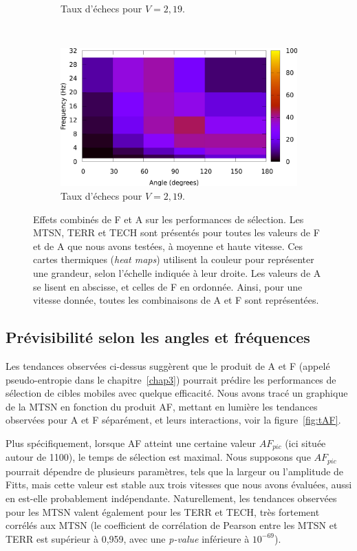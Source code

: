 \begin{figure}[!htb]
\begin{subfigure}[t]{\subImgWlineplot}
			\caption{Taux d'échecs pour $V = 2,19$.}
			\label{fig:hmap_f_146}
		\end{subfigure}
		~
		\begin{subfigure}[t]{\subImgWlineplot}
			\centering
			\includegraphics[width=\textwidth]{figures/ch4/average_failure_rates_081}
			\caption{Taux d'échecs pour $V = 2,19$.}
			\label{fig:hmap_f_219}
		\end{subfigure}
		\caption[Effets combinés de F et A sur les performances de sélection]{Effets combinés de F et A sur les performances de sélection. Les MTSN, TERR et TECH sont présentés pour toutes les valeurs de F et de A que nous avons testées, à moyenne et haute vitesse. Ces cartes thermiques (\emph{heat maps}) utilisent la couleur pour représenter une grandeur, selon l'échelle indiquée à leur droite. Les valeurs de A se lisent en abscisse, et celles de F en ordonnée. Ainsi, pour une vitesse donnée, toutes les combinaisons de A et F sont représentées.}
		\label{fig:hmaps}
	\end{figure}

	\subsection{Prévisibilité selon les angles et fréquences}
	\label{sub:previsibility}
	Les tendances observées ci-dessus suggèrent que le produit de A et F (appelé pseudo-entropie dans le chapitre~\ref{chap3}) pourrait prédire les performances de sélection de cibles mobiles avec quelque efficacité. Nous avons tracé un graphique de la MTSN en fonction du produit AF, mettant en lumière les tendances observées pour A et F séparément, et leurs interactions, voir la figure~\ref{fig:tAF}.
	
	Plus spécifiquement, lorsque AF atteint une certaine valeur $AF_{pic}$ (ici située autour de 1100), le temps de sélection est maximal. Nous supposons que $AF_{pic}$ pourrait dépendre de plusieurs paramètres, tels que la largeur ou l'amplitude de Fitts, mais cette valeur est stable aux trois vitesses que nous avons évaluées, aussi en est-elle probablement indépendante. Naturellement, les tendances observées pour les MTSN valent également pour les TERR et TECH, très fortement corrélés aux MTSN (le coefficient de corrélation de Pearson entre les MTSN et TERR est supérieur à 0,959, avec une \emph{p-value} inférieure à $10^{-69}$).
	

